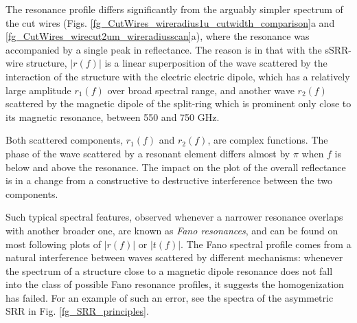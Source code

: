 The resonance profile differs significantly from the arguably simpler spectrum of the cut wires (Figs. \ref{fg_CutWires_wireradius1u_cutwidth_comparison}a and \ref{fg_CutWires_wirecut2um_wireradiusscan}a), where the resonance was accompanied by a single peak in reflectance. 
The reason is in that with the sSRR-wire structure, $|r(f)|$ is a linear superposition of the wave scattered by the interaction of the structure with the electric electric dipole, which has a relatively large amplitude $r_{1}(f)$ over broad spectral range, and another wave $r_{2}(f)$ scattered by the magnetic dipole of the split-ring which is prominent only close to its magnetic resonance, between 550 and 750 GHz.

Both scattered components, $r_1(f)$ and $r_2(f)$, are complex functions. The phase of the wave scattered by a resonant element differs almost by $\pi$ when $f$ is below and above the resonance. The impact on the plot of the overall reflectance is in a change from a constructive to destructive interference between the two components. 

Such typical spectral features, observed whenever a narrower resonance overlaps with another broader one, are known as \textit{Fano resonances}, and can be found on most following plots of $|r(f)|$ or $|t(f)|$. The Fano spectral profile comes from a natural interference between waves scattered by different mechanisms: whenever the spectrum of a structure close to a magnetic dipole resonance does not fall into the class of possible Fano resonance profiles, it suggests the homogenization has failed. For an example of such an error, see the spectra of the asymmetric SRR in Fig. \ref{fg_SRR_principles}.  

